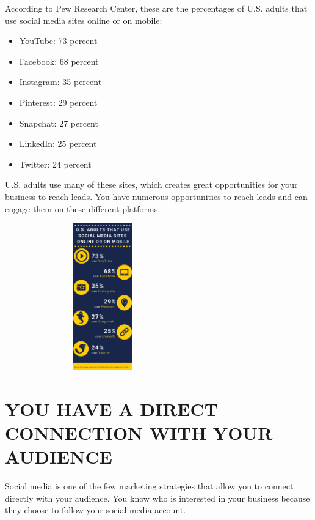 \documentclass[a4paper]{article}
\begin{document}
According to Pew Research Center, these are the percentages of U.S. adults that use social media sites online or on mobile:
 \begin{itemize}
  \item YouTube: 73 percent
  \item Facebook: 68 percent
 \item Instagram: 35 percent
 \item Pinterest: 29 percent
 \item Snapchat: 27 percent
 \item LinkedIn: 25 percent
 \item Twitter: 24 percent
 \end{itemize}
 U.S. adults use many of these sites, which creates great opportunities for your business to reach leads. You have numerous opportunities to reach leads and can engage them on these different platforms.
 \begin{figure}[h]
 \centering
 \includegraphics[width=2.5in,height=2.5in]{sa}
 \end{figure}
 \section{ YOU HAVE A DIRECT CONNECTION WITH YOUR AUDIENCE}
 Social media is one of the few marketing strategies that allow you to connect directly with your audience. You know who is interested in your business because they choose to follow your social media account.
\end{document}
